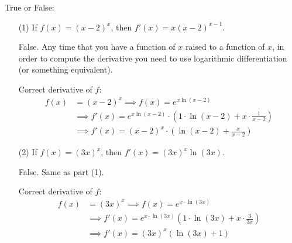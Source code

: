 \documentclass[nooutcomes]{ximera}
\begin{document}
\begin{problem}
  True or False:
  \begin{enumerate}
    \item[(1)]
      If $f(x) = (x-2)^x$, then $f'(x) = x (x-2)^{x-1}$.
      \begin{freeResponse}
        False.
        Any time that you have a function of $x$ raised to a function of $x$, in order to compute the derivative you need to use logarithmic differentiation (or something equivalent).

        Correct derivative of $f$:
        \begin{align*}
          f(x) &= (x-2)^x \implies f(x) = e^{x \ln(x-2)} \\
          &\implies f'(x) = e^{x \ln(x-2)} \cdot \left(1\cdot\ln(x-2) + x \cdot \frac{1}{x-2}\right) \\
          &\implies f'(x) = (x-2)^x \cdot \left(\ln(x-2) + \frac{x}{x-2}\right)
        \end{align*}
        \end{freeResponse}	
		
      \item[(2)]
        If $f(x) = (3x)^x$, then $f'(x) = (3x)^x \ln (3x)$.
	\begin{freeResponse}
          False.  Same as part (1).

          Correct derivative of $f$:
          \begin{align*}
            f(x) &= (3x)^x \implies f(x) = e^{x \cdot \ln(3x)} \\
            &\implies f'(x)  = e^{x \cdot \ln(3x)} \left(1 \cdot \ln(3x) + x \cdot \frac{3}{3x} \right) \\
            &\implies f'(x)  = (3x)^x \left(\ln(3x) + 1 \right)
          \end{align*}
	\end{freeResponse}	
	\end{enumerate}
\end{problem}
\end{document}
